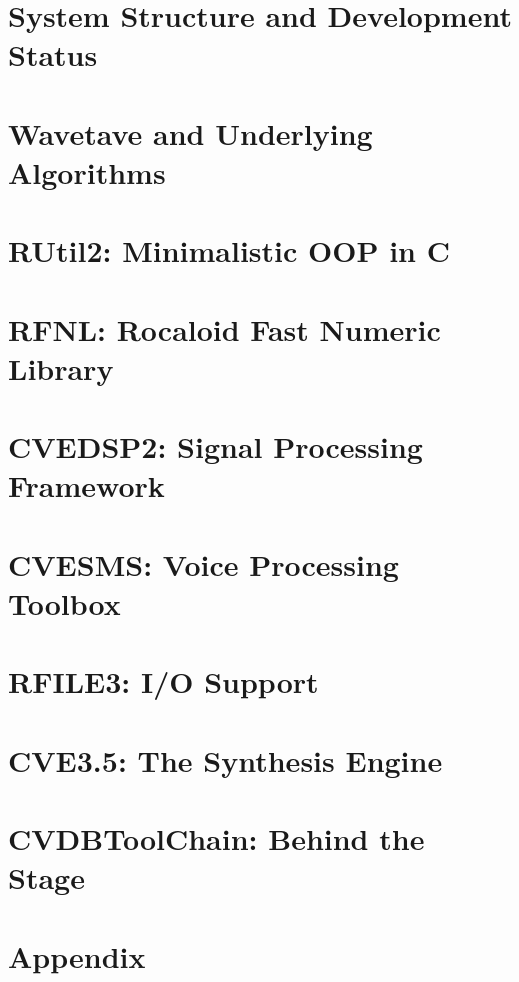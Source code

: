 \chapter{System Structure and Development Status}



\chapter{Wavetave and Underlying Algorithms}

\chapter{RUtil2: Minimalistic OOP in C}

\chapter{RFNL: Rocaloid Fast Numeric Library}

\chapter{CVEDSP2: Signal Processing Framework}

\chapter{CVESMS: Voice Processing Toolbox}

\chapter{RFILE3: I/O Support}

\chapter{CVE3.5: The Synthesis Engine}

\chapter{CVDBToolChain: Behind the Stage}

\chapter{Appendix}

